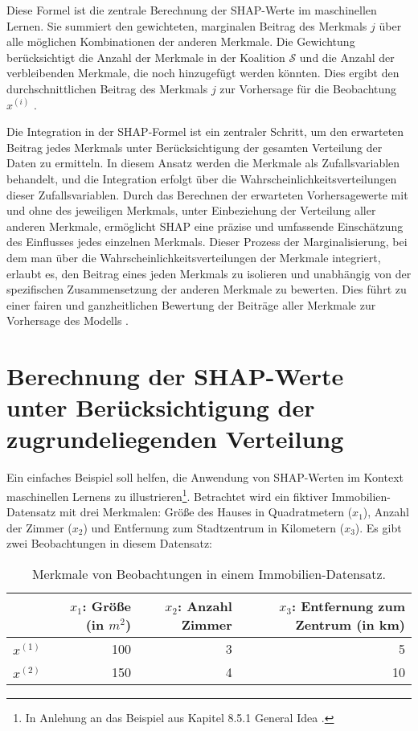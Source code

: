 Diese Formel ist die zentrale Berechnung der SHAP-Werte im maschinellen Lernen. 
Sie summiert den gewichteten, marginalen Beitrag des Merkmals $j$ über alle möglichen Kombinationen der anderen Merkmale. 
Die Gewichtung berücksichtigt die Anzahl der Merkmale in der Koalition $\mathcal{S}$ und die Anzahl der verbleibenden Merkmale, 
die noch hinzugefügt werden könnten. Dies ergibt den durchschnittlichen Beitrag des Merkmals $j$ zur Vorhersage für die 
Beobachtung $x^{(i)}$ \cite[S. 29, 30]{Molnar_2023}.

Die Integration in der SHAP-Formel ist ein zentraler Schritt, um den erwarteten Beitrag jedes Merkmals unter 
Berücksichtigung der gesamten Verteilung der Daten zu ermitteln. 
In diesem Ansatz werden die Merkmale als Zufallsvariablen behandelt, und die Integration erfolgt über 
die Wahrscheinlichkeitsverteilungen dieser Zufallsvariablen. Durch das Berechnen der erwarteten Vorhersagewerte mit 
und ohne des jeweiligen Merkmals, unter Einbeziehung der Verteilung aller anderen Merkmale, 
ermöglicht SHAP eine präzise und umfassende Einschätzung des Einflusses jedes einzelnen Merkmals. 
Dieser Prozess der Marginalisierung, bei dem man über die Wahrscheinlichkeitsverteilungen der Merkmale integriert, 
erlaubt es, den Beitrag eines jeden Merkmals zu isolieren und unabhängig von der spezifischen Zusammensetzung 
der anderen Merkmale zu bewerten. Dies führt zu einer fairen und ganzheitlichen Bewertung der Beiträge aller Merkmale 
zur Vorhersage des Modells \cite[S. 28]{Molnar_2023}.

\section{Berechnung der SHAP-Werte unter Berücksichtigung der zugrundeliegenden Verteilung}

Ein einfaches Beispiel soll helfen, die Anwendung von SHAP-Werten im 
Kontext maschinellen Lernens zu illustrieren\footnote{In Anlehung an das Beispiel aus Kapitel 8.5.1 \glqq{}General Idea\grqq{} \cite[S.215f]{Molnar_2022}.}. Betrachtet wird ein fiktiver 
Immobilien-Datensatz mit drei Merkmalen: Größe des Hauses in Quadratmetern ($x_1$), Anzahl der Zimmer ($x_2$) 
und Entfernung zum Stadtzentrum in Kilometern ($x_3$). Es gibt zwei Beobachtungen in diesem Datensatz:

\begin{table}[H]
    \footnotesize
    \begin{tabularx}{\textwidth}{Xrrr}
    \toprule
     & $x_1$: Größe (in $m^2$) &  $x_2$: Anzahl Zimmer &  $x_3$: Entfernung zum Zentrum (in km) \\
    \midrule
    $x^{(1)}$ & 100 & 3 & 5 \\
    $x^{(2)}$ & 150 & 4 & 10 \\
    \bottomrule
    \end{tabularx}
    \caption{Merkmale von Beobachtungen in einem Immobilien-Datensatz.}
    \label{tab:example}
\end{table}

